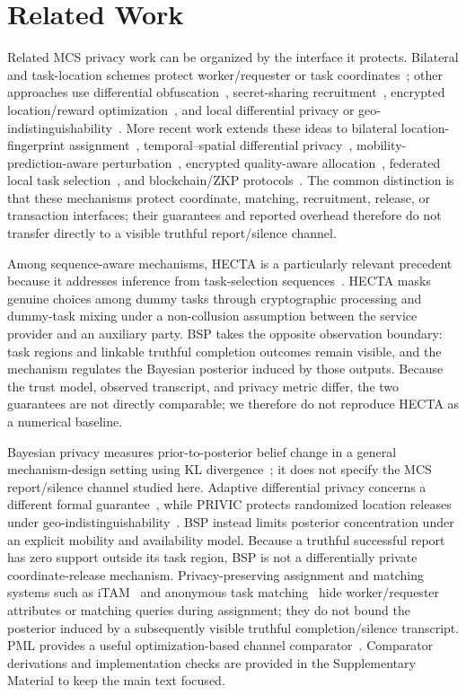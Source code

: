 \documentclass[10pt,journal,compsoc]{IEEEtran}
\begin{document}
\section{Related Work}
\label{sec:related}
Related MCS privacy work can be organized by the interface it protects. Bilateral and task-location schemes protect worker/requester or task coordinates~\cite{itam2021,taskloc2022}; other approaches use differential obfuscation~\cite{pmta2024}, secret-sharing recruitment~\cite{ppur2024}, encrypted location/reward optimization~\cite{lrppsta2025}, and local differential privacy or geo-indistinguishability~\cite{mtadprh2025}. More recent work extends these ideas to bilateral location-fingerprint assignment~\cite{fingerprint}, temporal--spatial differential privacy~\cite{tasp2025}, mobility-prediction-aware perturbation~\cite{p2taskmp2025}, encrypted quality-aware allocation~\cite{qpta2024}, federated local task selection~\cite{fedsense2025}, and blockchain/ZKP protocols~\cite{blockchainpmc2026}. The common distinction is that these mechanisms protect coordinate, matching, recruitment, release, or transaction interfaces; their guarantees and reported overhead therefore do not transfer directly to a visible truthful report/silence channel.

Among sequence-aware mechanisms, HECTA is a particularly relevant precedent because it addresses inference from task-selection sequences~\cite{inference2026}. HECTA masks genuine choices among dummy tasks through cryptographic processing and dummy-task mixing under a non-collusion assumption between the service provider and an auxiliary party. BSP takes the opposite observation boundary: task regions and linkable truthful completion outcomes remain visible, and the mechanism regulates the Bayesian posterior induced by those outputs. Because the trust model, observed transcript, and privacy metric differ, the two guarantees are not directly comparable; we therefore do not reproduce HECTA as a numerical baseline.

Bayesian privacy measures prior-to-posterior belief change in a general mechanism-design setting using KL divergence~\cite{bayesian}; it does not specify the MCS report/silence channel studied here. Adaptive differential privacy concerns a different formal guarantee~\cite{adaptive2023}, while PRIVIC protects randomized location releases under geo-indistinguishability~\cite{privic2024}. BSP instead limits posterior concentration under an explicit mobility and availability model. Because a truthful successful report has zero support outside its task region, BSP is not a differentially private coordinate-release mechanism. Privacy-preserving assignment and matching systems such as iTAM~\cite{itam2021} and anonymous task matching~\cite{shutask2018} hide worker/requester attributes or matching queries during assignment; they do not bound the posterior induced by a subsequently visible truthful completion/silence transcript. PML provides a useful optimization-based channel comparator~\cite{pml2024}. Comparator derivations and implementation checks are provided in the Supplementary Material to keep the main text focused.
\end{document}
